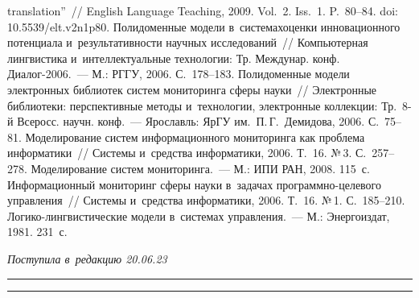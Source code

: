 \begin{multicols}{2}
{{\begin{thebibliography}{99}
translation''~// English Language Teaching, 2009. Vol.~2. Iss.~1. P.~80--84. doi: 10.5539/elt.v2n1p80.
 Полидоменные модели в~сис\-те\-мах\linebreak оценки инновационного потенциала 
и~ре\-зуль\-та\-тивности научных исследований~// Компьютерная лингвисти\-ка и~интеллектуальные 
технологии: Тр. Междунар. конф. Диалог-2006.~--- М.: РГГУ, 2006. С.~178--183.
 Полидоменные модели электронных биб\-лио\-тек сис\-тем мониторинга сферы 
нау\-ки~// Электронные биб\-лио\-те\-ки: перспективные методы и~технологии, электронные 
коллекции: Тр.\ 8-й Всеросс. научн. конф.~--- Ярославль: ЯрГУ им.\ П.\,Г.~Демидова, 2006. 
С.~75--81.
 Моделирование сис\-тем информационного мониторинга как проб\-ле\-ма 
информатики~// Сис\-те\-мы и~средства информатики, 2006. Т.~16. №\,3. С.~257--278.
 Моделирование сис\-тем мониторинга.~--- 
М.: ИПИ РАН, 2008. 115~с.
 Информационный мониторинг сферы нау\-ки в~задачах  
про\-грам\-мно-це\-ле\-во\-го управ\-ле\-ния~// Сис\-те\-мы и~средства информатики, 2006. 
Т.~16. №\,1. С.~185--210.
 Ло\-ги\-ко-линг\-ви\-сти\-че\-ские модели в~сис\-те\-мах управ\-ле\-ния.~--- 
М.: Энергоиздат, 1981. 231~с.
\end{thebibliography}

 }
 }

\end{multicols}

\vspace*{-12pt}

\hfill{\small\textit{Поступила в~редакцию 20.06.23}}

\vspace*{6pt}




\hrule

\vspace*{2pt}

\hrule



\def\tit{FORMALIZED DESCRIPTION OF~STATISTICAL INFORMATION PROCESSING IN~DATABASES}


